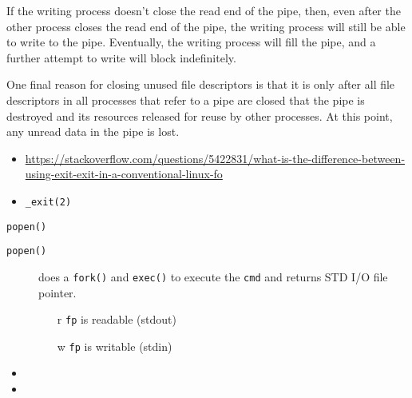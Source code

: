 \begin{itemize}
  If the writing process doesn't close the read end of the pipe, then, even after the
  other process closes the read end of the pipe, the writing process will still be able to
  write to the pipe. Eventually, the writing process will fill the pipe, and a further
  attempt to write will block indefinitely.

  One final reason for closing unused file descriptors is that it is only after all file
  descriptors in all processes that refer to a pipe are closed that the pipe is destroyed
  and its resources released for reuse by other processes. At this point, any unread data
  in the pipe is lost.
\end{itemize}

\begin{frame}
\end{frame}

\begin{itemize}
\item
  \url{https://stackoverflow.com/questions/5422831/what-is-the-difference-between-using-exit-exit-in-a-conventional-linux-fo}
\item \texttt{\_exit(2)}
\end{itemize}

\begin{frame}{\texttt{popen()}}
\begin{center}
\end{center}
\begin{description}
\item[\texttt{popen()}] does a \texttt{fork()} and \texttt{exec()} to execute the
  \texttt{cmd} and returns STD I/O file pointer.
  \begin{itemize}
  \item[r] \texttt{fp} is readable (stdout)
  \item[w] \texttt{fp} is writable (stdin)
  \end{itemize}
\end{description}
\end{frame}

\begin{itemize}
\item {}
\item {}
\end{itemize}

